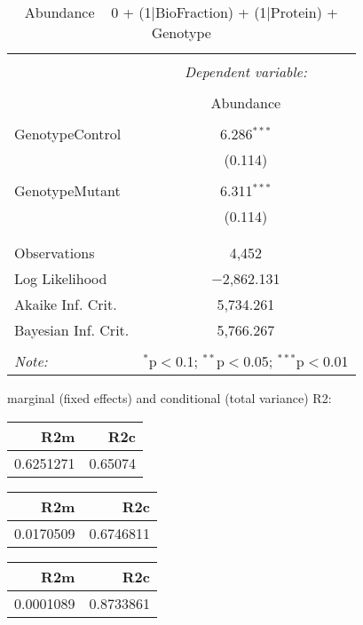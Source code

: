 \documentclass[11pt]{report}
\begin{document}
\begin{table}[!htbp] \centering 
  \caption{Abundance ~ 0 + (1|BioFraction) + (1|Protein) + Genotype} 
  \label{} 
\begin{tabular}{@{\extracolsep{5pt}}lc} 
\\[-1.8ex]\hline 
\hline \\[-1.8ex] 
 & \multicolumn{1}{c}{\textit{Dependent variable:}} \\ 
\cline{2-2} 
\\[-1.8ex] & Abundance \\ 
\hline \\[-1.8ex] 
 GenotypeControl & 6.286$^{***}$ \\ 
  & (0.114) \\ 
  & \\ 
 GenotypeMutant & 6.311$^{***}$ \\ 
  & (0.114) \\ 
  & \\ 
\hline \\[-1.8ex] 
Observations & 4,452 \\ 
Log Likelihood & $-$2,862.131 \\ 
Akaike Inf. Crit. & 5,734.261 \\ 
Bayesian Inf. Crit. & 5,766.267 \\ 
\hline 
\hline \\[-1.8ex] 
\textit{Note:}  & \multicolumn{1}{r}{$^{*}$p$<$0.1; $^{**}$p$<$0.05; $^{***}$p$<$0.01} \\ 
\end{tabular} 
\end{table} 
marginal (fixed effects) and conditional (total variance) R2:

\begin{tabular}{r|r}
\hline
R2m & R2c\\
\hline
0.6251271 & 0.65074\\
\hline
\end{tabular}

\begin{tabular}{r|r}
\hline
R2m & R2c\\
\hline
0.0170509 & 0.6746811\\
\hline
\end{tabular}

\begin{tabular}{r|r}
\hline
R2m & R2c\\
\hline
0.0001089 & 0.8733861\\
\hline
\end{tabular}
\end{document}
